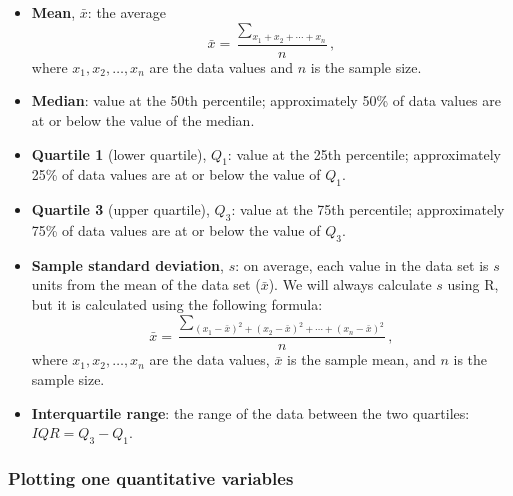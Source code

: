 \documentclass[
]{report}
\begin{document}
\begin{itemize}
\item
  \textbf{Mean}, \(\bar{x}\): the average
  \[ 
  \bar{x} = \frac{\sum_{x_1 + x_2 + \cdots + x_n}}{n},
  \]
  where \(x_1, x_2, \ldots, x_n\) are the data values and \(n\) is the sample size.
\item
  \textbf{Median}: value at the 50th percentile; approximately 50\% of data values are at or below the value of the median.
\item
  \textbf{Quartile 1} (lower quartile), \(Q_1\): value at the 25th percentile; approximately 25\% of data values are at or below the value of \(Q_1\).
\item
  \textbf{Quartile 3} (upper quartile), \(Q_3\): value at the 75th percentile; approximately 75\% of data values are at or below the value of \(Q_3\).
\item
  \textbf{Sample standard deviation}, \(s\): on average, each value in the data set is \(s\) units from the mean of the data set (\(\bar{x}\)). We will always calculate \(s\) using R, but it is calculated using the following formula:
  \[
  \bar{x} = \frac{\sum_{(x_1-\bar{x})^2 + (x_2-\bar{x})^2 + \cdots + (x_n-\bar{x})^2}}{n},
  \]
  where \(x_1, x_2, \ldots, x_n\) are the data values, \(\bar{x}\) is the sample mean, and \(n\) is the sample size.
\item
  \textbf{Interquartile range}: the range of the data between the two quartiles: \(IQR = Q_3-Q_1\).
\end{itemize}

\subsubsection*{Plotting one quantitative variables}\label{plotting-one-quantitative-variables}
\end{document}
